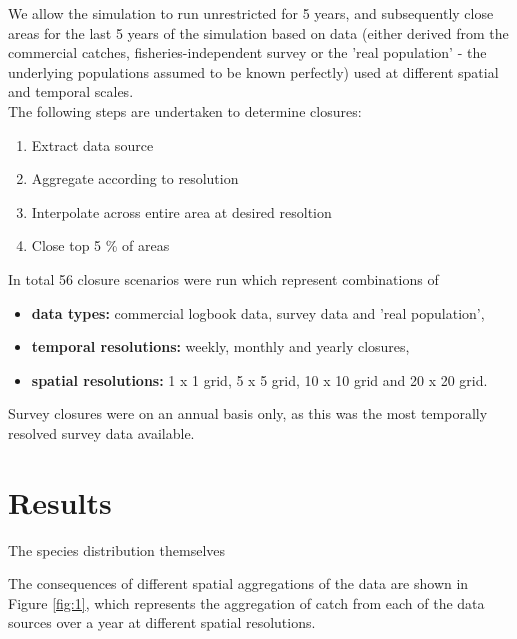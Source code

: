 \documentclass[review]{elsarticle}
\begin{document}
We allow the simulation to run unrestricted for 5 years, and subsequently close
areas for the last 5 years of the simulation based on data (either derived from
the commercial catches, fisheries-independent survey or the 'real population' -
the underlying populations assumed to be known perfectly) used at different
spatial and temporal scales. \\

The following steps are undertaken to determine closures:

\begin{enumerate}
	\item Extract data source
	\item Aggregate according to resolution
	\item Interpolate across entire area at desired resoltion
	\item Close top 5 \% of areas
\end{enumerate}

In total 56 closure scenarios were run which represent combinations of

\begin{itemize}
	\item \textbf{data types:} commercial logbook data, survey data and
		'real population',
	\item \textbf{temporal resolutions:} weekly, monthly and yearly
		closures,
	\item \textbf{spatial resolutions:} 1 x 1 grid, 5 x 5 grid, 10 x 10
		grid and 20 x 20 grid.
\end{itemize}

Survey closures were on an annual basis only, as this was the most temporally
resolved survey data available.

\section{Results}

The species distribution themselves 

The consequences of different spatial aggregations of the data are shown in
Figure \ref{fig:1}, which represents the aggregation of catch from each of the
data sources over a year at different spatial resolutions. \\
\end{document}
